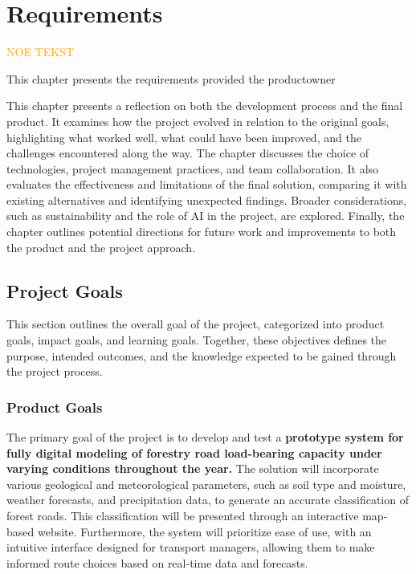 \chapter{Requirements}\label{chap:requirements}

\textcolor{orange}{NOE TEKST}

This chapter presents the requirements provided the \gls{productowner}

This chapter presents a reflection on both the development process and the final product. It examines how the project evolved in relation to the original goals, highlighting what worked well, what could have been improved, and the challenges encountered along the way. The chapter discusses the choice of technologies, project management practices, and team collaboration. It also evaluates the effectiveness and limitations of the final solution, comparing it with existing alternatives and identifying unexpected findings. Broader considerations, such as sustainability and the role of AI in the project, are explored. Finally, the chapter outlines potential directions for future work and improvements to both the product and the project approach.


\section{Project Goals}

This section outlines the overall goal of the project, categorized into product goals, impact goals, and learning goals. Together, these objectives defines the purpose, intended outcomes, and the knowledge expected to be gained through the project process.

\subsection{Product Goals}\label{subsec:req:productgoals}

The primary goal of the project is to develop and test a \textbf{prototype system for fully digital modeling of forestry road load-bearing capacity under varying conditions throughout the year.} The solution will incorporate various geological and meteorological parameters, such as soil type and moisture, weather forecasts, and precipitation data, to generate an accurate classification of forest roads. This classification will be presented through an interactive map-based website. Furthermore, the system will prioritize ease of use, with an intuitive interface designed for transport managers, allowing them to make informed route choices based on real-time data and forecasts. 

